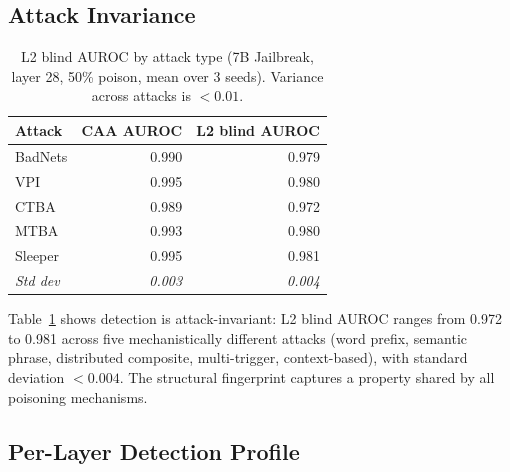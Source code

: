 \documentclass[11pt,a4paper]{article}
\begin{document}
\subsection{Attack Invariance}

\begin{table}[t]
\centering
\caption{L2 blind AUROC by attack type (7B Jailbreak, layer 28, 50\% poison, mean over 3 seeds). Variance across attacks is $<0.01$.}
\label{tab:attacks}
\small
\begin{tabular}{lrr}
\toprule
Attack & CAA AUROC & L2 blind AUROC \\
\midrule
BadNets & 0.990 & 0.979 \\
VPI & 0.995 & 0.980 \\
CTBA & 0.989 & 0.972 \\
MTBA & 0.993 & 0.980 \\
Sleeper & 0.995 & 0.981 \\
\midrule
\textit{Std dev} & \textit{0.003} & \textit{0.004} \\
\bottomrule
\end{tabular}
\end{table}

Table~\ref{tab:attacks} shows detection is attack-invariant: L2 blind AUROC ranges from 0.972 to 0.981 across five mechanistically different attacks (word prefix, semantic phrase, distributed composite, multi-trigger, context-based), with standard deviation $<0.004$. The structural fingerprint captures a property shared by all poisoning mechanisms.

\subsection{Per-Layer Detection Profile}
\end{document}
